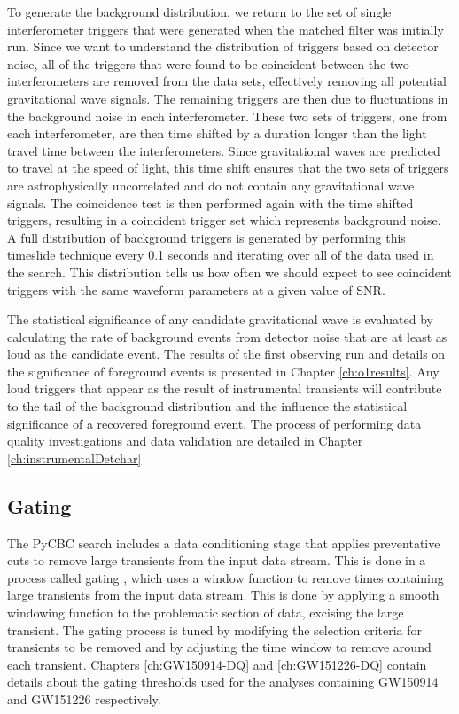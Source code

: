 To generate the background distribution, we return to the set of single interferometer 
triggers that were generated when the matched filter was initially run. Since we want 
to understand the distribution of triggers based on detector noise, all of the triggers 
that were found to be coincident between the two interferometers are removed from the 
data sets, effectively removing all
potential gravitational wave signals. The remaining triggers are then due to fluctuations 
in the background noise in each interferometer. These two sets of triggers,
one from each interferometer, are then time shifted by a duration longer than the
light travel time between the interferometers.
Since gravitational waves are predicted to travel at the speed of light,
this time shift ensures that the
two sets of triggers are astrophysically uncorrelated and do not contain any gravitational
wave signals. The coincidence test is then performed again with the time shifted triggers,
resulting in a coincident trigger set which represents background noise. 
A full distribution of background triggers is generated by performing this timeslide
technique every 0.1 seconds and iterating over all of the data used in the search. This 
distribution tells us how often we should expect to see coincident triggers with the 
same waveform parameters at a given value of SNR.

The statistical significance of any candidate gravitational wave is
evaluated by calculating the rate of background events from detector noise 
that are at least as
loud as the candidate event. The results of the first observing run and details on 
the significance of foreground events is presented in Chapter \ref{ch:o1results}. 
Any loud triggers that appear as the result of instrumental
transients will contribute to the tail of the background distribution and
the influence the statistical significance of a recovered foreground event.
The process of performing data quality investigations and data validation are 
detailed in Chapter \ref{ch:instrumentalDetchar}

\subsection{Gating}\label{sec:gating}

The PyCBC search includes a data conditioning stage that applies preventative  
cuts to remove large transients from the input data stream. 
This is done in a process called gating \cite{Usman:2015kfa}, which uses a
window function to remove times containing large transients from the input data stream. This is done
by applying a smooth windowing function to the problematic section of data, excising the large transient.
The gating process is tuned by modifying the selection criteria for transients to be removed and
by adjusting the time window to remove around each transient.
Chapters \ref{ch:GW150914-DQ} and \ref{ch:GW151226-DQ} contain details about the 
gating thresholds used for the analyses containing GW150914 and GW151226 respectively. 

